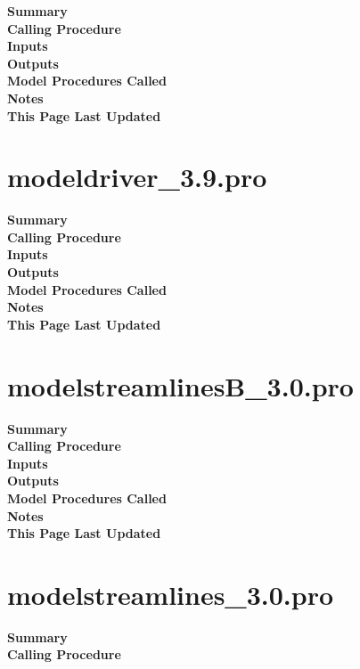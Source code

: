 \documentclass[11pt]{article}
\newcommand\descrip[1]{\textsf{\textbf{\large{#1}}}\\}
\begin{document}
\descrip{Summary}

\descrip{Calling Procedure}

\descrip{Inputs}

\descrip{Outputs}

\descrip{Model Procedures Called}

\descrip{Notes}

\descrip{This Page Last Updated}

\clearpage

\section{modeldriver\_3.9.pro} \label{sec:modeldriver}

\descrip{Summary}

\descrip{Calling Procedure}

\descrip{Inputs}

\descrip{Outputs}

\descrip{Model Procedures Called}

\descrip{Notes}

\descrip{This Page Last Updated}

\clearpage

\section{modelstreamlinesB\_3.0.pro} \label{sec:modelstreamlinesB}

\descrip{Summary}

\descrip{Calling Procedure}

\descrip{Inputs}

\descrip{Outputs}

\descrip{Model Procedures Called}

\descrip{Notes}

\descrip{This Page Last Updated}

\clearpage

\section{modelstreamlines\_3.0.pro} \label{sec:modelstreamlines}

\descrip{Summary}

\descrip{Calling Procedure}
\end{document}

